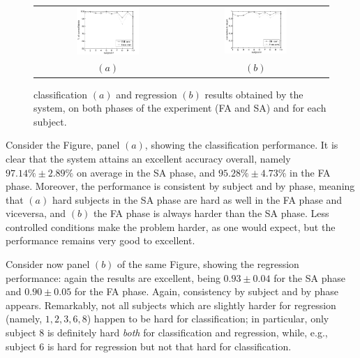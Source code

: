 \begin{figure}[!ht] \centering
  \begin{tabular}{cc}
    \includegraphics[width=0.45\textwidth]{figs/perfClass} &
    \includegraphics[width=0.45\textwidth]{figs/perfRegr} \\
    $(a)$ & $(b)$ \\
  \end{tabular}
  \caption{classification $(a)$ and regression $(b)$ results obtained
    by the system, on both phases of the experiment (FA and SA) and
    for each subject.}
  \label{fig:results}
\end{figure}

Consider the Figure, panel $(a)$, showing the classification
performance. It is clear that the system attains an excellent accuracy
overall, namely $97.14\% \pm 2.89\%$ on average in the SA phase, and
$95.28\% \pm 4.73\%$ in the FA phase. Moreover, the performance is
consistent by subject and by phase, meaning that $(a)$ hard subjects
in the SA phase are hard as well in the FA phase and viceversa, and
$(b)$ the FA phase is always harder than the SA phase. Less controlled
conditions make the problem harder, as one would expect, but the
performance remains very good to excellent.

Consider now panel $(b)$ of the same Figure, showing the regression
performance: again the results are excellent, being $0.93
\pm 0.04$ for the SA phase and $0.90 \pm 0.05$ for the FA
phase. Again, consistency by subject and by phase appears. Remarkably,
not all subjects which are slightly harder for regression (namely,
$1,2,3,6,8$) happen to be hard for classification; in particular, only
subject $8$ is definitely hard \emph{both} for classification and
regression, while, e.g., subject $6$ is hard for regression but not
that hard for classification.

